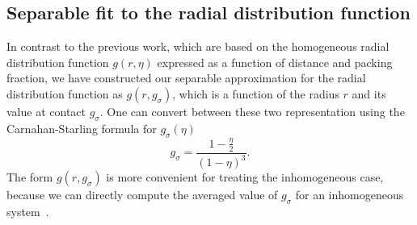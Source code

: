 \documentclass[letterpaper,twocolumn,amsmath,amssymb,pre,aps,10pt]{revtex4-1}
\begin{document}


\subsection{Separable fit to the radial distribution function}

In contrast to the previous work, which are based on the homogeneous
radial distribution function $g(r,\eta)$ expressed as a function of
distance and packing fraction, we have constructed our separable
approximation for the radial distribution function as $g(r,
g_\sigma)$, which is a function of the radius $r$ and its value at
contact $g_\sigma$.  One can convert between these two representation
using the Carnahan-Starling formula for $g_\sigma(\eta)$
\begin{equation}
  g_\sigma = \frac{1-\tfrac{\eta}{2}}{(1-\eta)^3}.
\end{equation}
The form $g(r, g_\sigma)$ is more convenient for treating the
inhomogeneous case, because we can directly compute the averaged value
of $g_\sigma$ for an inhomogeneous system~\cite{schulte2012using}.
\end{document}
